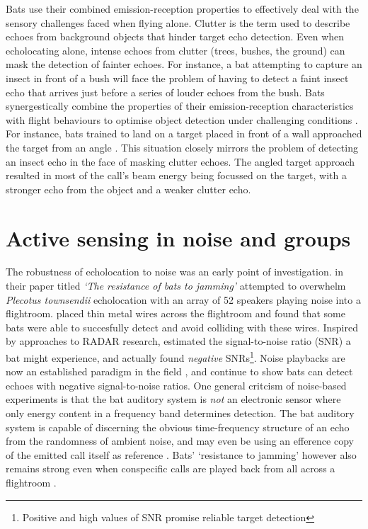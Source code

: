 \documentclass[
]{book}
\begin{document}
Bats use their combined emission-reception properties to effectively deal with the sensory challenges faced when flying alone. Clutter is the term used to describe echoes from background objects that hinder target echo detection. Even when echolocating alone, intense echoes from clutter (trees, bushes, the ground) can mask the detection of fainter echoes. For instance, a bat attempting to capture an insect in front of a bush will face the problem of having to detect a faint insect echo that arrives just before a series of louder echoes from the bush. Bats synergestically combine the properties of their emission-reception characteristics with flight behaviours to optimise object detection under challenging conditions \citep{yovel2010optimal, taub2020segregating}. For instance, bats trained to land on a target placed in front of a wall approached the target from an angle \citep{taub2020segregating}. This situation closely mirrors the problem of detecting an insect echo in the face of masking clutter echoes. The angled target approach resulted in most of the call's beam energy being focussed on the target, with a stronger echo from the object and a weaker clutter echo.

\hypertarget{active-sensing-in-noise-and-groups}{%
\section{Active sensing in noise and groups}\label{active-sensing-in-noise-and-groups}}

The robustness of echolocation to noise was an early point of investigation. \citet{griffinresistance} in their paper titled \emph{`The resistance of bats to jamming'} attempted to overwhelm \emph{Plecotus townsendii} echolocation with an array of 52 speakers playing noise into a flightroom. \citet{griffinresistance} placed thin metal wires across the flightroom and found that some bats were able to succesfully detect and avoid colliding with these wires. Inspired by approaches to RADAR research, \citet{griffinresistance} estimated the signal-to-noise ratio (SNR) a bat might experience, and actually found \emph{negative} SNRs\footnote{Positive and high values of SNR promise reliable target detection}. Noise playbacks are now an established paradigm in the field \citep{roverud1985discrimination, m1989a, jones1994individual, tressler2009context, hage2013ambient, hage2014ambient, luo2015linking}, and continue to show bats can detect echoes with negative signal-to-noise ratios. One general critcism of noise-based experiments is that the bat auditory system is \emph{not} an electronic sensor where only energy content in a frequency band determines detection. The bat auditory system is capable of discerning the obvious time-frequency structure of an echo from the randomness of ambient noise, and may even be using an efference copy of the emitted call itself as reference \citep{simmons2012biosonar}. Bats' `resistance to jamming' however also remains strong even when conspecific calls are played back from all across a flightroom \citep{amichai2015a}.
\end{document}
